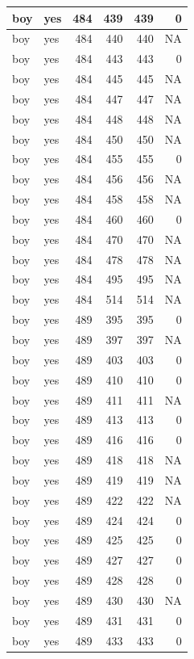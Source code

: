 \documentclass[man]{apa6}
\begin{document}
\begin{tabular}{l|l|r|r|r|r}
\hline
boy & yes & 484 & 439 & 439 & 0\\
\hline
boy & yes & 484 & 440 & 440 & NA\\
\hline
boy & yes & 484 & 443 & 443 & 0\\
\hline
boy & yes & 484 & 445 & 445 & NA\\
\hline
boy & yes & 484 & 447 & 447 & NA\\
\hline
boy & yes & 484 & 448 & 448 & NA\\
\hline
boy & yes & 484 & 450 & 450 & NA\\
\hline
boy & yes & 484 & 455 & 455 & 0\\
\hline
boy & yes & 484 & 456 & 456 & NA\\
\hline
boy & yes & 484 & 458 & 458 & NA\\
\hline
boy & yes & 484 & 460 & 460 & 0\\
\hline
boy & yes & 484 & 470 & 470 & NA\\
\hline
boy & yes & 484 & 478 & 478 & NA\\
\hline
boy & yes & 484 & 495 & 495 & NA\\
\hline
boy & yes & 484 & 514 & 514 & NA\\
\hline
boy & yes & 489 & 395 & 395 & 0\\
\hline
boy & yes & 489 & 397 & 397 & NA\\
\hline
boy & yes & 489 & 403 & 403 & 0\\
\hline
boy & yes & 489 & 410 & 410 & 0\\
\hline
boy & yes & 489 & 411 & 411 & NA\\
\hline
boy & yes & 489 & 413 & 413 & 0\\
\hline
boy & yes & 489 & 416 & 416 & 0\\
\hline
boy & yes & 489 & 418 & 418 & NA\\
\hline
boy & yes & 489 & 419 & 419 & NA\\
\hline
boy & yes & 489 & 422 & 422 & NA\\
\hline
boy & yes & 489 & 424 & 424 & 0\\
\hline
boy & yes & 489 & 425 & 425 & 0\\
\hline
boy & yes & 489 & 427 & 427 & 0\\
\hline
boy & yes & 489 & 428 & 428 & 0\\
\hline
boy & yes & 489 & 430 & 430 & NA\\
\hline
boy & yes & 489 & 431 & 431 & 0\\
\hline
boy & yes & 489 & 433 & 433 & 0\\

\end{tabular}
\end{document}
